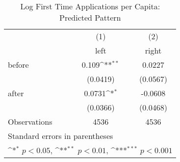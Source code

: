\begin{table}[htbp]\centering
\def\sym#1{\ifmmode^{#1}\else\(^{#1}\)\fi}
\caption{Log First Time Applications per Capita: Predicted Pattern}
\begin{tabular}{l*{2}{c}}
\hline\hline
                    &\multicolumn{1}{c}{(1)}&\multicolumn{1}{c}{(2)}\\
                    &\multicolumn{1}{c}{left}&\multicolumn{1}{c}{right}\\
\hline
before              &       0.109\sym{**} &      0.0227         \\
                    &    (0.0419)         &    (0.0567)         \\
[1em]
after               &      0.0731\sym{*}  &     -0.0608         \\
                    &    (0.0366)         &    (0.0468)         \\
\hline
Observations        &        4536         &        4536         \\
\hline\hline
\multicolumn{3}{l}{\footnotesize Standard errors in parentheses}\\
\multicolumn{3}{l}{\footnotesize \sym{*} \(p<0.05\), \sym{**} \(p<0.01\), \sym{***} \(p<0.001\)}\\
\end{tabular}
\end{table}

